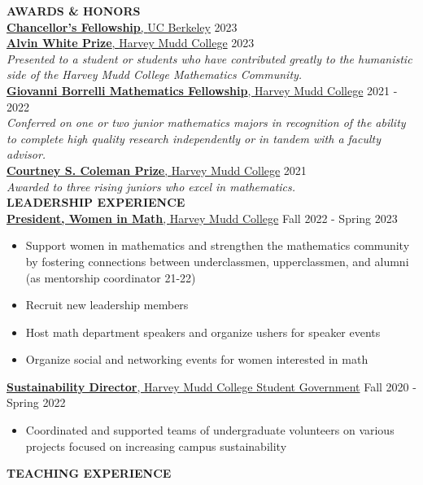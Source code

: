 \documentclass[11pt]{article}
\newcommand{\hdr}[1]{\textcolor{blue(ryb)}{\textbf{#1}}}
\newcommand{\role}[3]{\underline{\textbf{#1}, {#2}} \hfill #3}
\begin{document}
\medskip
\hdr{AWARDS \& HONORS}\\
\role{Chancellor's Fellowship}{UC Berkeley}{2023}\\
\role{Alvin White Prize}{Harvey Mudd College}{2023}\\
\textit{Presented to a student or students who have contributed greatly to the humanistic side of the Harvey Mudd College Mathematics Community.}\\
\role{Giovanni Borrelli Mathematics Fellowship}{Harvey Mudd College}{2021 - 2022}\\
\textit{Conferred on one or two junior mathematics majors in recognition of the ability to complete high quality research independently or in tandem with a faculty advisor.}\\
\role{Courtney S. Coleman Prize}{Harvey Mudd College}{2021}\\
\textit{Awarded to three rising juniors who excel in mathematics.}\\
\hdr{LEADERSHIP EXPERIENCE}\\
\role{President, Women in Math}{Harvey Mudd College}{Fall 2022 - Spring 2023}
\begin{itemize}
\item Support women in mathematics and strengthen the mathematics community by fostering connections between underclassmen, upperclassmen, and alumni (as mentorship coordinator 21-22)
\item Recruit new leadership members
\item Host math department speakers and organize ushers for speaker events
\item Organize social and networking events for women interested in math
\end{itemize}
\smallskip
\role{Sustainability Director}{Harvey Mudd College Student Government}{Fall 2020 - Spring 2022}
\begin{itemize}
\item Coordinated and supported teams of undergraduate volunteers on various projects focused on increasing campus sustainability
\end{itemize}
\newpage
\hdr{TEACHING EXPERIENCE}\\
\end{document}
